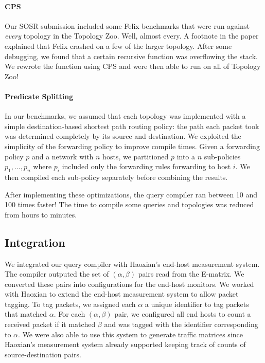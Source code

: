 \documentclass{hw}
\begin{document}
\paragraph{CPS}
Our SOSR submission included some Felix benchmarks that were run against
\emph{every} topology in the Topology Zoo. Well, almost every. A footnote in
the paper explained that Felix crashed on a few of the larger topology. After
some debugging, we found that a certain recursive function was overflowing the
stack. We rewrote the function using CPS and were then able to run on all of
Topology Zoo!

\paragraph{Predicate Splitting}
In our benchmarks, we assumed that each topology was implemented with a simple
destination-based shortest path routing policy: the path each packet took was
determined completely by its source and destination.  We exploited the
simplicity of the forwarding policy to improve compile times.  Given a
forwarding policy $p$ and a network with $n$ hosts, we partitioned $p$ into a
$n$ sub-policies $p_1, \ldots, p_n$ where $p_i$ included only the forwarding
rules forwarding to host $i$. We then compiled each sub-policy separately
before combining the results.

After implementing these optimizations, the query compiler ran between 10 and
100 times faster! The time to compile some queries and topologies was reduced
from hours to minutes.

\subsection{Integration}
We integrated our query compiler with Haoxian's end-host measurement system.
The compiler outputed the set of $(\alpha, \beta)$ pairs read from the
E-matrix.  We converted these pairs into configurations for the end-host
monitors. We worked with Haoxian to extend the end-host measurement system to
allow packet tagging. To tag packets, we assigned each $\alpha$ a unique
identifier to tag packets that matched $\alpha$. For each $(\alpha, \beta)$
pair, we configured all end hosts to count a received packet if it matched
$\beta$ and was tagged with the identifier corresponding to $\alpha$.  We were
also able to use this system to generate traffic matrices since Haoxian's
measurement system already supported keeping track of counts of
source-destination pairs.
\end{document}
